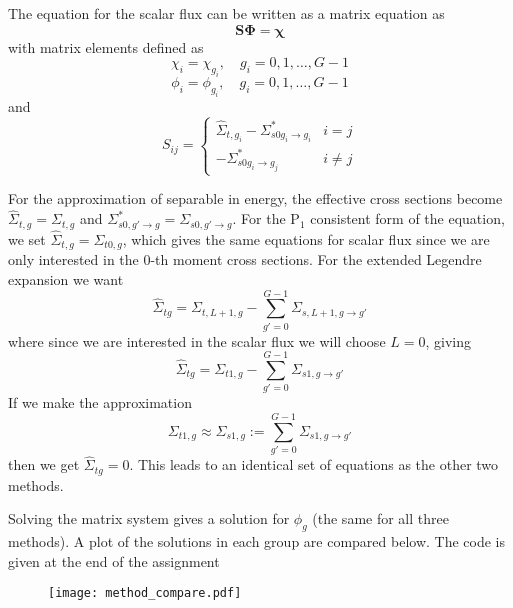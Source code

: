 \documentclass[12pt]{article}
\newcommand{\ra}{\rightarrow}
\newenvironment{solnum}[2][Solution]{\begin{trivlist}
\item[\hskip \labelsep {\bfseries #1}\hskip \labelsep {\bfseries #2:}]\hspace{0.3in}\newline\newline}{\end{trivlist}}
\begin{document}
\begin{solnum}{1-2}
\begin{solnum}{2}
The equation for the scalar flux can be written as a matrix equation as
\begin{equation}
    \mathbf{S\Phi} = \boldsymbol{\chi}
\end{equation}
with matrix elements defined as
\begin{equation}
    \chi_i = \chi_{g_i}, \quad g_i=0,1,\ldots,G-1
\end{equation}
\begin{equation}
    \phi_i = \phi_{g_i}, \quad g_i=0,1,\ldots,G-1
\end{equation}
and
\begin{equation}
    S_{ij} = \left\{\begin{matrix}
        \hat\Sigma_{t,g_i} -\Sigma^*_{s0g_{i}\ra g_{i}} & i=j
        \\  
        -\Sigma^*_{s0g_i\ra g_j} & i \neq j
    \end{matrix}\right.
\end{equation}

For the approximation of separable in energy, the effective cross sections become $\hat\Sigma_{t,g} = \Sigma_{t,g}$ and
$\Sigma^*_{s0,g'\ra g} = \Sigma_{s0,g'\ra g}$.
For the P$_1$ consistent form of the equation, we set $\hat\Sigma_{t,g} =
\Sigma_{t0,g}$, which gives the same equations for scalar flux since we
are only interested in the $0$-th moment cross sections. For the extended Legendre
expansion we want
\begin{equation}
    \hat\Sigma_{tg} = \Sigma_{t,L+1,g} - \sum_{g'=0}^{G-1} \Sigma_{s,L+1,g\ra g'}
\end{equation}
where since we are interested in the scalar flux we will choose $L=0$, giving
\begin{equation}
    \hat\Sigma_{tg} = \Sigma_{t1,g} - \sum_{g'=0}^{G-1} \Sigma_{s1,g\ra g'}
\end{equation}
If we make the approximation
\begin{equation}
\Sigma_{t1,g} \approx \Sigma_{s1,g} := \sum_{g'=0}^{G-1} \Sigma_{s1,g\ra g'}
\end{equation}
then we get $\hat\Sigma_{tg} = 0$.  This leads to an identical set of equations as
the other two methods.

Solving the matrix system gives a solution for $\phi_g$ (the same for all three
methods).  A plot of the solutions
in each group are compared below. The code is given at the end of the assignment

\begin{figure}[h!]
    \centering
    \texttt{[image: method\_compare.pdf]}
\end{figure}






\end{solnum}
\end{solnum}
\end{document}
